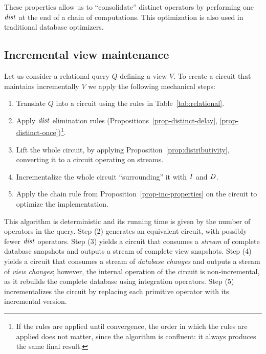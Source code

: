 These properties allow us to ``consolidate'' distinct operators by
performing one $\mathit{dist}$ at the end of a chain of computations.
This optimization is also used in traditional database optimizers.

\vspace{-3ex}
\subsection{Incremental view maintenance}\label{sec:ivm}

Let us consider a relational query $Q$ defining a view $V$.  To create
a circuit that maintains incrementally $V$ we apply the following
mechanical steps:

\begin{algorithm}
  \label{algorithm-inc}\quad
\begin{enumerate}[nosep, leftmargin=\parindent]
    \item Translate $Q$ into a circuit using the rules in Table~\ref{tab:relational}.
    \item Apply $\mathit{dist}$ elimination rules
      (Propositions~\ref{prop-distinct-delay},
      \ref{prop-distinct-once})\footnote{If the rules are applied
      until convergence, the order in which the rules
      are applied does not matter, since the algorithm is confluent:
      it always produces the same final result.}.
    \item Lift the whole circuit, by applying Proposition~\ref{prop:distributivity},
    converting it to a circuit operating on streams.
    \item Incrementalize the whole circuit ``surrounding'' it with $\mathit{I}$ and $\mathit{D}$.
    \item Apply the chain rule from
      Proposition~\ref{prop-inc-properties} on the circuit to optimize
      the implementation.
\end{enumerate}
\end{algorithm}

This algorithm is deterministic and its running time
is given by the number of operators in the query.
Step (2) generates an equivalent circuit, with possibly fewer
$\mathit{dist}$ operators.  Step (3) yields a circuit that consumes a
\emph{stream} of complete database snapshots and outputs a stream of
complete view snapshots. Step (4) yields a circuit that consumes a
stream of \emph{database changes} and outputs a stream of \emph{view
changes}; however, the internal operation of the circuit is
non-incremental, as it rebuilds the complete database using
integration operators.  Step (5) incrementalizes the circuit by
replacing each primitive operator with its incremental version.

